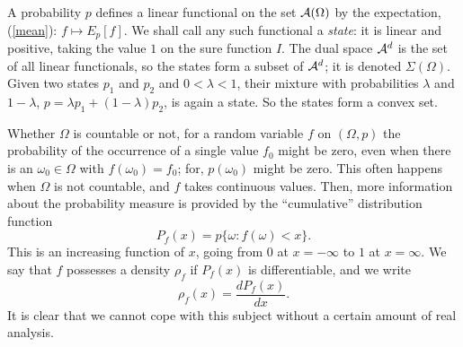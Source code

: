 \documentclass[12pt]{article}
\begin{document}
A probability $p$ defines a linear functional on the set ${\cal A}(\Omega)$
by the expectation, (\ref{mean}): $f\mapsto E_p[f]$.
We shall call any such functional a {\em state}: it is linear and positive,
taking the value $1$ on the sure function $I$.
The dual space ${\cal A}^d$ is the set of all linear functionals, so the
states form a subset of ${\cal A}^d$; it is denoted $\Sigma(\Omega)$.
Given two states $p_1$ and $p_2$ and $0<\lambda<1$, their mixture
with probabilities $\lambda$ and $1-\lambda$, $p=\lambda p_1+(1-
\lambda)p_2$, is again a state. So the states form a convex set.

Whether $\Omega$ is countable or not, for a random variable $f$ on
$(\Omega,p)$
the probability of the occurrence of a single value $f_0$ might be zero,
even when there is an $\omega_0\in\Omega$ with $f(\omega_0)=f_0$;
for, $p(\omega_0)$ might be zero. This often happens when $\Omega$ is
not countable, and $f$ takes continuous values. Then, more information
about the probability measure is provided by the ``cumulative''
distribution function
\begin{equation}
P_f(x)=p\{\omega:f(\omega)<x\}.
\end{equation}
This is an increasing function of $x$, going from $0$ at $x=-\infty$ to $1$
at $x=\infty$.
We say that $f$ possesses a density $\rho_f$ if $P_f(x)$ is
differentiable, and we write
\begin{equation}
\rho_f(x)=\frac{dP_f(x)}{dx}.
\end{equation}
It is clear that we cannot cope with this subject without a certain
amount of real analysis.
\end{document}

